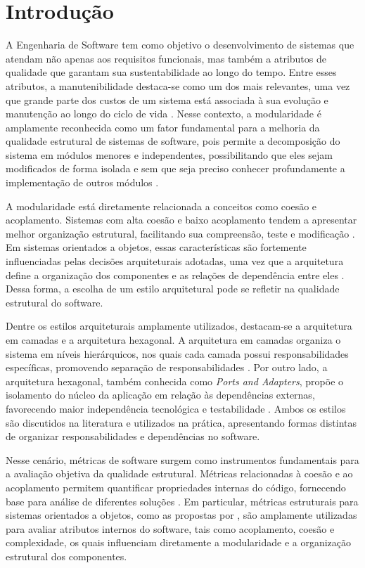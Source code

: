 \chapter{Introdução}
\label{cap:introducao}

A Engenharia de Software tem como objetivo o desenvolvimento de sistemas que atendam não apenas aos requisitos funcionais, 
mas também a atributos de qualidade que garantam sua sustentabilidade ao longo do tempo. Entre esses atributos, a manutenibilidade 
destaca-se como um dos mais relevantes, uma vez que grande parte dos custos de um sistema está associada à sua evolução e manutenção 
ao longo do ciclo de vida \cite{pressman2010}. Nesse contexto, a modularidade é amplamente reconhecida como um fator fundamental 
para a melhoria da qualidade estrutural de sistemas de software, pois permite a decomposição do sistema em módulos menores e independentes, 
possibilitando que eles sejam modificados de forma isolada e sem que seja preciso conhecer profundamente a implementação de
outros módulos \cite{parnas1972}.

A modularidade está diretamente relacionada a conceitos como coesão e acoplamento. Sistemas com alta coesão e baixo acoplamento 
tendem a apresentar melhor organização estrutural, facilitando sua compreensão, teste e modificação \cite{yourdon1978}. 
Em sistemas orientados a objetos, essas características são fortemente influenciadas pelas decisões arquiteturais adotadas, 
uma vez que a arquitetura define a organização dos componentes e as relações de dependência entre eles \cite{bass2012,sommerville2011}. 
Dessa forma, a escolha de um estilo arquitetural pode se refletir na qualidade estrutural do software.

Dentre os estilos arquiteturais amplamente utilizados, destacam-se a arquitetura em camadas e a arquitetura hexagonal. A arquitetura 
em camadas organiza o sistema em níveis hierárquicos, nos quais cada camada possui responsabilidades específicas, promovendo separação 
de responsabilidades \cite{fowler2003}. Por outro lado, a arquitetura hexagonal, também conhecida como \textit{Ports and Adapters}, 
propõe o isolamento do núcleo da aplicação em relação às dependências externas, favorecendo maior independência tecnológica e 
testabilidade \cite{cockburn2005}. Ambos os estilos são discutidos na literatura e utilizados na prática, apresentando formas 
distintas de organizar responsabilidades e dependências no software.

Nesse cenário, métricas de software surgem como instrumentos fundamentais para a avaliação objetiva da qualidade estrutural.
Métricas relacionadas à coesão e ao acoplamento permitem quantificar propriedades internas do código, fornecendo base para análise de diferentes  
soluções \cite{fenton2015}. Em particular, métricas estruturais para sistemas orientados a objetos, como as propostas por 
, são amplamente utilizadas para avaliar atributos internos do software, tais como acoplamento, 
coesão e complexidade, os quais influenciam diretamente a modularidade e a organização estrutural dos componentes.


